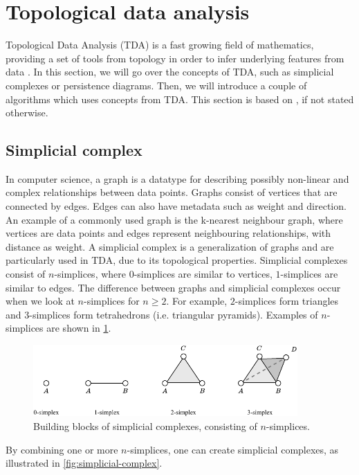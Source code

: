 \section{Topological data analysis}
Topological Data Analysis (TDA) is a fast growing field of mathematics, providing a set of tools from topology in order to infer underlying features from data \cite{chazal2021introduction}. In this section, we will go over the concepts of TDA, such as simplicial complexes or persistence diagrams. Then, we will introduce a couple of algorithms which uses concepts from TDA. This section is based on \cites{Edelsbrunner2010}{chazal2021introduction}, if not stated otherwise.

\subsection{Simplicial complex}
\label{sec:simplicial-complex}
In computer science, a graph is a datatype for describing possibly non-linear and complex relationships between data points. Graphs consist of vertices that are connected by edges. Edges can also have metadata such as weight and direction. An example of a commonly used graph is the k-nearest neighbour graph, where vertices are data points and edges represent neighbouring relationships, with distance as weight. A simplicial complex is a generalization of graphs and are particularly used in TDA, due to its topological properties. Simplicial complexes consist of $n$-simplices, where $0$-simplices are similar to vertices, $1$-simplices are similar to edges. The difference between graphs and simplicial complexes occur when we look at $n$-simplices for $n \geq 2$. For example, $2$-simplices form triangles and $3$-simplices form tetrahedrons (i.e. triangular pyramids). Examples of $n$-simplices are shown in \cref{fig:n-simplices-example}.
\begin{figure}[H]
    \centering
    \includegraphics[width=0.9\textwidth]{thesis/figures/n-simplices_cropped.pdf}
    \caption{Building blocks of simplicial complexes, consisting of $n$-simplices.}
    \label{fig:n-simplices-example}
\end{figure}
By combining one or more $n$-simplices, one can create simplicial complexes, as illustrated in \cref{fig:simplicial-complex}.
